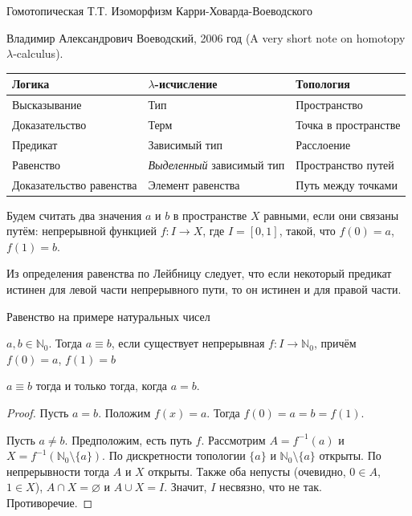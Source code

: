 \documentclass[aspectratio=169]{beamer}
\begin{document}
\begin{frame}{Гомотопическая Т.Т. Изоморфизм Карри-Ховарда-Воеводского}

Владимир Александрович Воеводский, 2006 год (A very short note on homotopy $\lambda$-calculus).

\vspace{0.3cm}

\begin{tabular}{lll}
Логика & $\lambda$-исчисление & Топология\\\hline
Высказывание & Тип & Пространство\\
Доказательство & Терм & Точка в пространстве\\
Предикат & Зависимый тип & Расслоение\\
Равенство &\emph{Выделенный} зависимый тип & Пространство путей\\
Доказательство равенства & Элемент равенства & Путь между точками
\end{tabular}

\begin{dfn}Будем считать два значения $a$ и $b$ в пространстве $X$ равными, если они связаны путём: непрерывной функцией $f:I\rightarrow X$,
где $I = [0,1]$, такой, что $f(0)=a$, $f(1)=b$.\end{dfn}
Из определения равенства по Лейбницу следует, что если некоторый предикат истинен для левой части непрерывного пути, то он истинен и для правой части.
\end{frame}

\begin{frame}{Равенство на примере натуральных чисел}
\begin{dfn}$a,b \in \mathbb{N}_0$. Тогда $a\equiv b$, если существует непрерывная $f: I\rightarrow\mathbb{N}_0$, причём $f(0)=a$, $f(1)=b$\end{dfn}
\begin{lmm}$a\equiv b$ тогда и только тогда, когда $a=b$.\end{lmm}
\begin{proof}Пусть $a = b$. Положим $f(x) = a$. Тогда $f(0)=a=b=f(1)$.

Пусть $a \ne b$. Предположим, есть путь $f$. Рассмотрим $A=f^{-1}(a)$ и $X=f^{-1}(\mathbb{N}_0\setminus\{a\})$. 
По дискретности топологии $\{a\}$ и $\mathbb{N}_0\setminus\{a\}$ открыты. По непрерывности тогда $A$ и $X$ открыты.
Также оба непусты (очевидно, $0 \in A$, $1 \in X$), $A \cap X = \varnothing$ и $A \cup X = I$. Значит, $I$ несвязно, что не так.
Противоречие.
\end{proof}
\end{frame}
\end{document}
